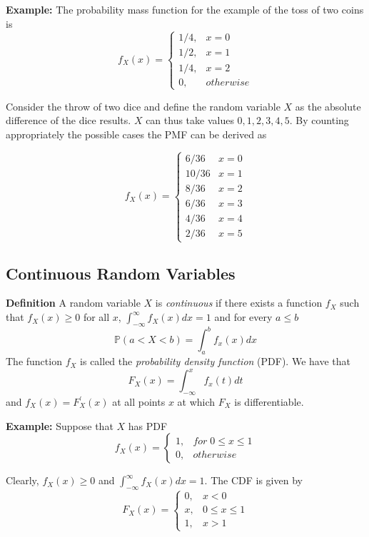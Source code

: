 \documentclass[
]{book}
\theoremstyle{definition}
\theoremstyle{definition}
\theoremstyle{definition}
\theoremstyle{definition}
\theoremstyle{remark}
\begin{document}
\textbf{Example:} The probability mass function for the example of the toss of two coins is
\[
f_X(x)=\left\{
\begin{array}{ll}
1/4, & x=0\\
1/2, & x=1\\
1/4, & x=2 \\
0, & otherwise
\end{array}
\right.
\]

Consider the throw of two dice and define the random variable \(X\) as the absolute difference of the dice results. \(X\) can thus take values \({0,1,2,3,4,5}\). By counting appropriately the possible cases the PMF can be derived as

\[
f_X(x)=\left\{
\begin{array}{ll}
6/36 & x=0 \\
10/36 & x=1 \\
8/36 & x=2\\
6/36 & x=3 \\
4/36 & x=4\\
2/36 & x=5
\end{array}
\right.
\]

\hypertarget{continuous-random-variables}{%
\subsection{Continuous Random Variables}\label{continuous-random-variables}}

\textbf{Definition} A random variable \(X\) is \emph{continuous} if there exists a function \(f_X\) such that \(f_X(x)\geq 0\) for all \(x\), \(\int_{-\infty}^{\infty}f_X(x)dx=1\) and for every \(a\leq b\)
\[
\mathbb{P}(a<X<b)=\int_a^bf_x(x)dx
\]
The function \(f_X\) is called the \emph{probability density function} (PDF). We have that
\[
F_X(x)=\int_{-\infty}^xf_x(t)dt
\]
and \(f_X(x)=F_X^{'}(x)\) at all points \(x\) at which \(F_X\) is differentiable.

\textbf{Example:} Suppose that \(X\) has PDF
\[
f_X(x)=\left\{
\begin{array}{ll}
1, & for  \; 0\leq x\leq 1\\
0, & otherwise
\end{array}
\right.
\]

Clearly, \(f_X(x)\geq 0\) and \(\int_{-\infty}^{\infty}f_X(x)dx=1\). The CDF is given by
\[
F_X(x)=\left\{
\begin{array}{ll}
0, & x<0\\
x, & 0\leq x \leq 1\\
1, & x>1
\end{array}
\right.
\]
\end{document}
